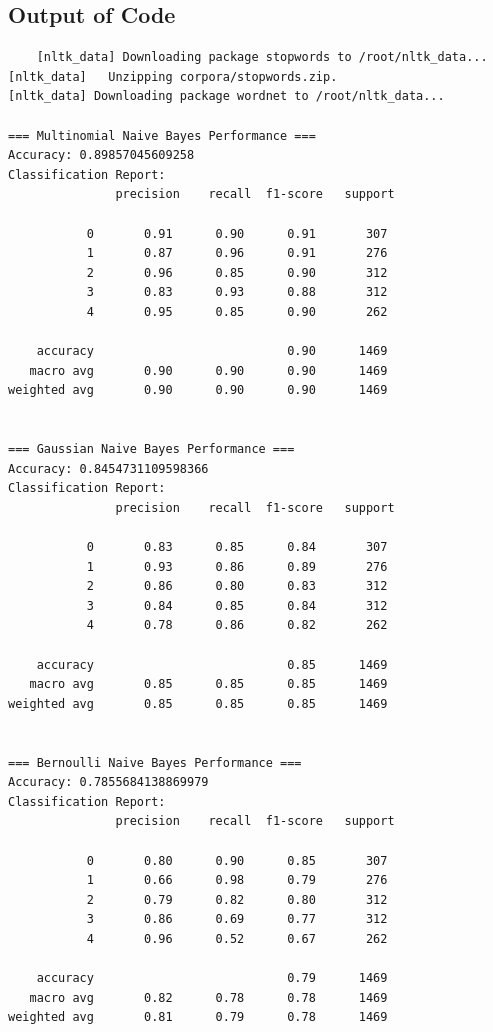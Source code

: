 \documentclass[a4paper,12pt]{article}
\begin{document}
\subsection{Output of Code}
\begin{verbatim}
    [nltk_data] Downloading package stopwords to /root/nltk_data...
[nltk_data]   Unzipping corpora/stopwords.zip.
[nltk_data] Downloading package wordnet to /root/nltk_data...

=== Multinomial Naive Bayes Performance ===
Accuracy: 0.89857045609258
Classification Report:
               precision    recall  f1-score   support

           0       0.91      0.90      0.91       307
           1       0.87      0.96      0.91       276
           2       0.96      0.85      0.90       312
           3       0.83      0.93      0.88       312
           4       0.95      0.85      0.90       262

    accuracy                           0.90      1469
   macro avg       0.90      0.90      0.90      1469
weighted avg       0.90      0.90      0.90      1469


=== Gaussian Naive Bayes Performance ===
Accuracy: 0.8454731109598366
Classification Report:
               precision    recall  f1-score   support

           0       0.83      0.85      0.84       307
           1       0.93      0.86      0.89       276
           2       0.86      0.80      0.83       312
           3       0.84      0.85      0.84       312
           4       0.78      0.86      0.82       262

    accuracy                           0.85      1469
   macro avg       0.85      0.85      0.85      1469
weighted avg       0.85      0.85      0.85      1469


=== Bernoulli Naive Bayes Performance ===
Accuracy: 0.7855684138869979
Classification Report:
               precision    recall  f1-score   support

           0       0.80      0.90      0.85       307
           1       0.66      0.98      0.79       276
           2       0.79      0.82      0.80       312
           3       0.86      0.69      0.77       312
           4       0.96      0.52      0.67       262

    accuracy                           0.79      1469
   macro avg       0.82      0.78      0.78      1469
weighted avg       0.81      0.79      0.78      1469






\end{verbatim}
\end{document}
